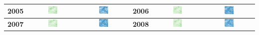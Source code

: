 \begin{longtable}{|c|c|c|c|c|c|}
    \textbf{2005} & \includegraphics[width=0.2\textwidth]{img_sat/NDVI_2005.png} & \includegraphics[width=0.2\textwidth]{img_sat/NSI_2005.png} &
    \textbf{2006} & \includegraphics[width=0.2\textwidth]{img_sat/NDVI_2006.png} & \includegraphics[width=0.2\textwidth]{img_sat/NSI_2006.png} \\
    \hline
    

    \textbf{2007} & \includegraphics[width=0.2\textwidth]{img_sat/NDVI_2007.png} & \includegraphics[width=0.2\textwidth]{img_sat/NSI_2007.png} &
    \textbf{2008} & \includegraphics[width=0.2\textwidth]{img_sat/NDVI_2008.png} & \includegraphics[width=0.2\textwidth]{img_sat/NSI_2008.png} \\
    \hline
    


\end{longtable}
